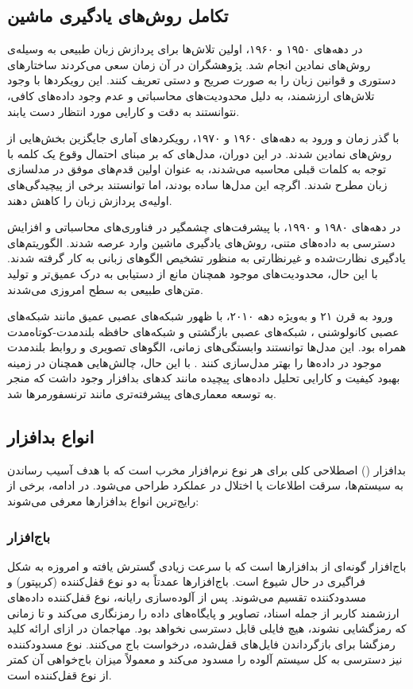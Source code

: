 \subsection{تکامل روش‌های یادگیری ماشین}
در دهه‌های ۱۹۵۰ و ۱۹۶۰، اولین تلاش‌ها برای پردازش زبان طبیعی به وسیله‌ی روش‌های نمادین انجام شد. پژوهشگران در آن زمان سعی می‌کردند ساختارهای دستوری و قوانین زبان را به صورت صریح و دستی تعریف کنند. این رویکردها با وجود تلاش‌های ارزشمند، به دلیل محدودیت‌های محاسباتی و عدم وجود داده‌های کافی، نتوانستند به دقت و کارایی مورد انتظار دست یابند.

با گذر زمان و ورود به دهه‌های ۱۹۶۰ و ۱۹۷۰، رویکردهای آماری جایگزین بخش‌هایی از روش‌های نمادین شدند. در این دوران، مدل‌های  که بر مبنای احتمال وقوع یک کلمه با توجه به کلمات قبلی محاسبه می‌شدند، به عنوان اولین قدم‌های موفق در مدلسازی زبان مطرح شدند. اگرچه این مدل‌ها ساده بودند، اما توانستند برخی از پیچیدگی‌های اولیه‌ی پردازش زبان را کاهش دهند.

در دهه‌های ۱۹۸۰ و ۱۹۹۰، با پیشرفت‌های چشمگیر در فناوری‌های محاسباتی و افزایش دسترسی به داده‌های متنی، روش‌های یادگیری ماشین وارد عرصه شدند. الگوریتم‌های یادگیری نظارت‌شده و غیرنظارتی به منظور تشخیص الگوهای زبانی به کار گرفته شدند. با این حال، محدودیت‌های موجود همچنان مانع از دستیابی به درک عمیق‌تر و تولید متن‌های طبیعی به سطح امروزی می‌شدند.

ورود به قرن ۲۱ و به‌ویژه دهه ۲۰۱۰، با ظهور شبکه‌های عصبی عمیق مانند شبکه‌های عصبی کانولوشنی
، شبکه‌های عصبی بازگشتی
 و شبکه‌های حافظه بلندمدت-کوتاه‌مدت
  همراه بود. این مدل‌ها توانستند وابستگی‌های زمانی، الگوهای تصویری و روابط بلندمدت موجود در داده‌ها را بهتر مدل‌سازی کنند \cite{Vinayakumar2019}. با این حال، چالش‌هایی همچنان در زمینه بهبود کیفیت و کارایی تحلیل داده‌های پیچیده مانند کدهای بدافزار وجود داشت که منجر به توسعه معماری‌های پیشرفته‌تری مانند ترنسفورمرها شد.

\subsection{انواع بدافزار}
بدافزار () اصطلاحی کلی برای هر نوع نرم‌افزار مخرب است که با هدف آسیب رساندن به سیستم‌ها، سرقت اطلاعات یا اختلال در عملکرد طراحی می‌شود. در ادامه، برخی از رایج‌ترین انواع بدافزارها معرفی می‌شوند:

\subsubsection{باج‌افزار}
باج‌افزار گونه‌ای از بدافزارها است که با سرعت زیادی گسترش یافته و امروزه به شکل فراگیری در حال شیوع است. باج‌افزارها عمدتاً به دو نوع قفل‌کننده (کریپتور) و مسدودکننده تقسیم می‌شوند. پس از آلوده‌سازی رایانه، نوع قفل‌کننده داده‌های ارزشمند کاربر از جمله اسناد، تصاویر و پایگاه‌های داده را رمزنگاری می‌کند و تا زمانی که رمزگشایی نشوند، هیچ فایلی قابل دسترسی نخواهد بود. مهاجمان در ازای ارائه کلید رمزگشا برای بازگرداندن فایل‌های قفل‌شده، درخواست باج می‌کنند. نوع مسدودکننده نیز دسترسی به کل سیستم آلوده را مسدود می‌کند و معمولاً میزان باج‌خواهی آن کمتر از نوع قفل‌کننده است.

